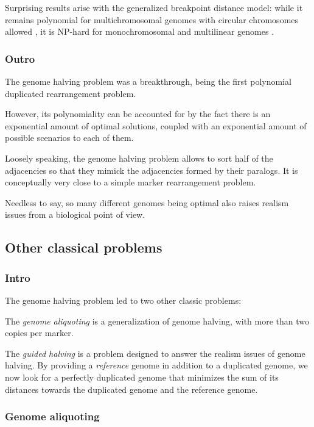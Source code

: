 \documentclass[11pt,final,twoside,nofrench]{thlifl}
\begin{document}
Surprising results arise with the generalized breakpoint distance model: while it remains polynomial for multichromosomal genomes with circular chromosomes allowed \cite{Tannier08}, it is NP-hard for monochromosomal and multilinear genomes \cite{K11}.

\subsubsection*{Outro}

The genome halving problem was a breakthrough, being the first polynomial duplicated rearrangement problem.

However, its polynomiality can be accounted for by the fact there is an exponential amount of optimal solutions, coupled with an exponential amount of possible scenarios to each of them.

Loosely speaking, the genome halving problem allows to sort half of the adjacencies so that they mimick the adjacencies formed by their paralogs. It is conceptually very close to a simple marker rearrangement problem.

Needless to say, so many different genomes being optimal also raises realism issues from a biological point of view.

\subsection{Other classical problems}

\subsubsection*{Intro}

The genome halving problem led to two other classic problems:

The \emph{genome aliquoting} is a generalization of genome halving, with more than two copies per marker.

The \emph{guided halving} is a problem designed to answer the realism issues of genome halving. By providing a \emph{reference} genome in addition to a duplicated genome, we now look for a perfectly duplicated genome that minimizes the sum of its distances towards the duplicated genome and the reference genome.

\subsubsection*{Genome aliquoting}
\end{document}

